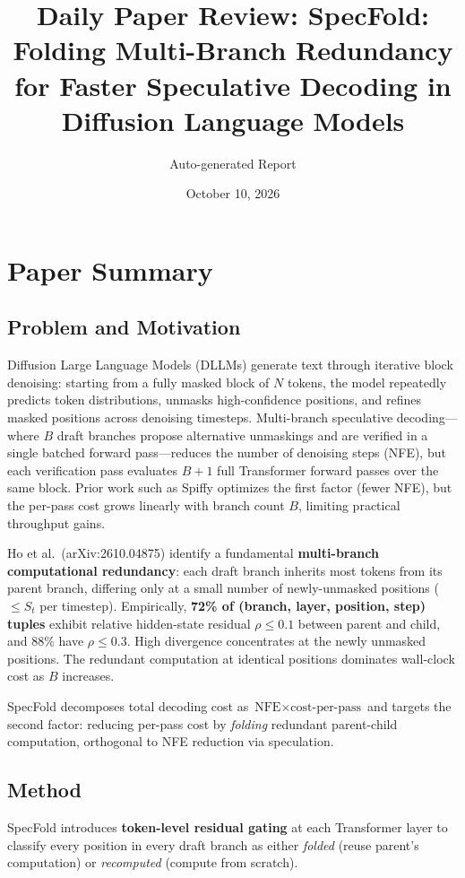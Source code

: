 \documentclass[11pt,a4paper]{article}
\title{Daily Paper Review: SpecFold: Folding Multi-Branch Redundancy for Faster Speculative Decoding in Diffusion Language Models}
\author{Auto-generated Report}
\date{October 10, 2026}
\begin{document}
\maketitle

\section{Paper Summary}

\subsection{Problem and Motivation}
Diffusion Large Language Models (DLLMs) generate text through iterative block denoising: starting from a fully masked block of $N$ tokens, the model repeatedly predicts token distributions, unmasks high-confidence positions, and refines masked positions across denoising timesteps. Multi-branch speculative decoding---where $B$ draft branches propose alternative unmaskings and are verified in a single batched forward pass---reduces the number of denoising steps (NFE), but each verification pass evaluates $B{+}1$ full Transformer forward passes over the same block. Prior work such as Spiffy optimizes the first factor (fewer NFE), but the per-pass cost grows linearly with branch count $B$, limiting practical throughput gains.

Ho et al.\ (arXiv:2610.04875) identify a fundamental \textbf{multi-branch computational redundancy}: each draft branch inherits most tokens from its parent branch, differing only at a small number of newly-unmasked positions ($\leq S_t$ per timestep). Empirically, \textbf{72\% of (branch, layer, position, step) tuples} exhibit relative hidden-state residual $\rho \leq 0.1$ between parent and child, and 88\% have $\rho \leq 0.3$. High divergence concentrates at the newly unmasked positions. The redundant computation at identical positions dominates wall-clock cost as $B$ increases.

SpecFold decomposes total decoding cost as $\text{NFE} \times \text{cost-per-pass}$ and targets the second factor: reducing per-pass cost by \emph{folding} redundant parent-child computation, orthogonal to NFE reduction via speculation.

\subsection{Method}
SpecFold introduces \textbf{token-level residual gating} at each Transformer layer to classify every position in every draft branch as either \emph{folded} (reuse parent's computation) or \emph{recomputed} (compute from scratch).
\end{document}
